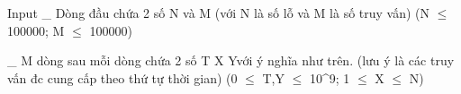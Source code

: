 Input
\_ Dòng đầu chứa 2 số N và M (với N là số lỗ và M là số truy vấn) (N $\le$ 100000; M $\le$ 100000)  

   \_ M dòng sau mỗi dòng chứa 2 số T X Yvới ý nghĩa như trên. (lưu ý là các truy vấn đc cung cấp theo thứ tự thời gian) (0 $\le$ T,Y $\le$ 10^9; 1 $\le$ X $\le$ N)
